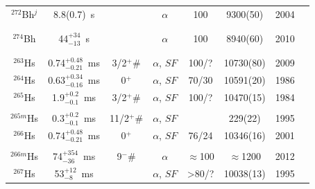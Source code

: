 \begin{center}
\begin{longtable}{c|ccccccl}
$^{272}$Bh$^j$& 8.8(0.7)~s	& 			&$\alpha$			&100		&9300(50)		    &2004	&{\tiny\cite{Oganessian2004,Dmitriev2005,Oganessian2005,Oganessian2011,Oganessian2012,Oganessian2013}}\\
			&				&			&					&			& 				    &		&{\tiny\cite{Rudolph2013,Dmitriev2014,Gates2015,Oganessian2015,Rudolph2015,Forsberg2016}}\\
			&				&			&					&			& 				    &		&{\tiny\cite{Aksenov2017,Oganessian2017,Gates2018,Oganessian2022c,Oganessian2022d}}\\
$^{274}$Bh	& 44$^{+34}_{-13}$~s& 		&$\alpha$		    &100		&8940(60)		    &2010	&{\tiny\cite{Oganessian2010,Oganessian2011,Oganessian2011a,Oganessian2012a,Oganessian2013,Rudolph2013}}\\
			&				&			&					&			& 				    &		&{\tiny\cite{Khuyagbaatar2019}}\\
\hline\\
$^{263}$Hs	& 0.74$^{+0.48}_{-0.21}$~ms&3/2$^+$\#&$\alpha$, $SF$&100/?	&10730(80)		    &2009	&{\tiny\cite{Dragojevic2009}}\\
$^{264}$Hs	& 0.63$^{+0.34}_{-0.16}$~ms&0$^+$&$\alpha$, $SF$&70/30		&10591(20)		    &1986	&{\tiny\cite{Muenzenberg1986,Muenzenberg1987,Sato2011}}\\
$^{265}$Hs	& 1.9$^{+0.2}_{-0.1}$~ms&3/2$^+$\#&$\alpha$, $SF$&100/?		&10470(15)		    &1984	&{\tiny\cite{Muenzenberg1984,Oganessian1984a,Muenzenberg1987,Hofmann1995,Hofmann1997b,Hessberger1999}}\\
			&				&			&					&			& 				    &		&{\tiny\cite{Hessberger2009,Sato2011}}\\
$^{265m}$Hs	& 0.3$^{+0.2}_{-0.1}$~ms&11/2$^+$\#&$\alpha$, $SF$&		    & 229(22)		    &1995	&{\tiny\cite{Hofmann1995,Hessberger1999,Hessberger2009}}\\
$^{266}$Hs	& 0.74$^{+0.48}_{-0.21}$~ms&0$^+$&$\alpha$, $SF$&76/24		&10346(16)		    &2001	&{\tiny\cite{Hofmann2001,Ackermann2011a,Ackermann2012,Ackermann2012a,Ackermann2015b,Muenzenberg2015}}\\
			&				&			&					&			& 				    &		&{\tiny\cite{Ackermann2017,Ackermann2024}}\\
$^{266m}$Hs	& 74$^{+354}_{-36}$~ms&9$^-$\#&$\alpha$			&$\approx$100&$\approx$1200     &2012	&{\tiny\cite{Ackermann2012,Ackermann2012a,Ackermann2015b,Muenzenberg2015,Ackermann2017,Ackermann2024}}\\
$^{267}$Hs	& 53$^{+12}_{-8}$~ms&		&$\alpha$, $SF$		&>80/?		&10038(13)		    &1995	&{\tiny\cite{Lazarev1995,Hofmann1997,Hofmann1997a,Hofmann1998,Folden2004,Morimoto2004}}\\

\end{longtable}
\end{center}
